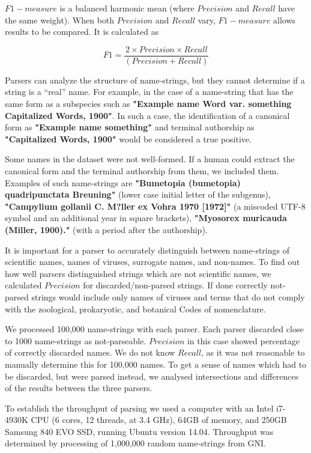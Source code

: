 \documentclass{bmcart}
\begin{document}
$F1-measure$ is a balanced harmonic mean (where $Precision$ and $Recall$ have
the same weight). When both $Precision$ and $Recall$ vary, $F1-measure$ allows
results to be compared. It is calculated as

\[F1 = \dfrac{2 \times Precision \times Recall}{(Precision + Recall)}\]

Parsers can analyze the structure of name-strings, but they cannot determine if
a string is a ``real'' name. For example, in the case of a name-string that has
the same form as a subspecies such as \textbf{"Example name Word var. something
Capitalized Words, 1900"}. In such a case, the identification of a canonical
form as \textbf{"Example name something"} and terminal authorship as
\textbf{"Capitalized Words, 1900"} would be considered a true positive.

Some names in the dataset were not well-formed. If a human could extract the
canonical form and the terminal authorship from them, we included them.
Examples of such name-strings are \textbf{"Bumetopia (bumetopia) quadripunctata
Breuning"} (lower case initial letter of the subgenus), \textbf{"Campylium
gollanii C. M?ller ex Vohra 1970 [1972]"} (a miscoded UTF-8 symbol and an
additional year in square brackets), \textbf{"Myosorex muricauda (Miller,
1900)."} (with a period after the authorship).

It is important for a parser to accurately distinguish between name-strings of
scientific names, names of viruses, surrogate names, and non-names. To find out
how well parsers distinguished strings which are not scientific names, we
calculated $Precision$ for discarded/non-parsed strings. If done correctly
not-parsed strings would include only names of viruses and terms that do not
comply with the zoological, prokaryotic, and botanical Codes of nomenclature.

We processed 100,000 name-strings with each parser.  Each parser discarded
close to 1000 name-strings as not-parseable.  $Precision$ in this case showed
percentage of correctly discarded names.  We do not know $Recall$, as it was
not reasonable to manually determine this for 100,000 names. To get a sense of
names which had to be discarded, but were parsed instead, we analysed
intersections and differences of the results between the three parsers.

To establish the throughput of parsing we used a computer with an Intel
i7-4930K CPU (6 cores, 12 threads, at 3.4 GHz), 64GB of memory, and 250GB
Samsung 840 EVO SSD, running Ubuntu version 14.04. Throughput was determined by
processing of 1,000,000 random name-strings from GNI.
\end{document}
